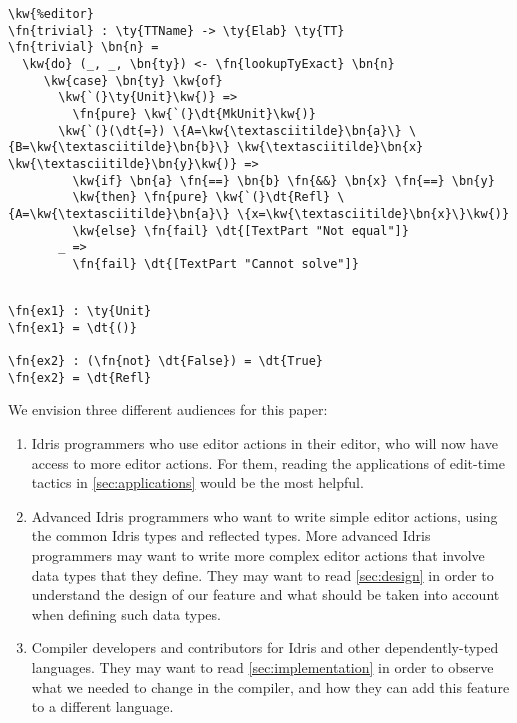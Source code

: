 \begin{Verbatim}
\kw{%editor}
\fn{trivial} : \ty{TTName} -> \ty{Elab} \ty{TT}
\fn{trivial} \bn{n} =
  \kw{do} (_, _, \bn{ty}) <- \fn{lookupTyExact} \bn{n}
     \kw{case} \bn{ty} \kw{of}
       \kw{`(}\ty{Unit}\kw{)} =>
         \fn{pure} \kw{`(}\dt{MkUnit}\kw{)}
       \kw{`(}(\dt{=}) \{A=\kw{\textasciitilde}\bn{a}\} \{B=\kw{\textasciitilde}\bn{b}\} \kw{\textasciitilde}\bn{x} \kw{\textasciitilde}\bn{y}\kw{)} =>
         \kw{if} \bn{a} \fn{==} \bn{b} \fn{&&} \bn{x} \fn{==} \bn{y}
         \kw{then} \fn{pure} \kw{`(}\dt{Refl} \{A=\kw{\textasciitilde}\bn{a}\} \{x=\kw{\textasciitilde}\bn{x}\}\kw{)}
         \kw{else} \fn{fail} \dt{[TextPart "Not equal"]}
       _ =>
         \fn{fail} \dt{[TextPart "Cannot solve"]}


\end{Verbatim}


\begin{Verbatim}
\fn{ex1} : \ty{Unit}
\fn{ex1} = \dt{()}

\fn{ex2} : (\fn{not} \dt{False}) = \dt{True}
\fn{ex2} = \dt{Refl}
\end{Verbatim}




We envision three different audiences for this paper:
\begin{enumerate}[(1)]
\item Idris programmers who use editor actions in their editor, who will now
  have access to more editor actions. For them, reading the applications of
edit-time tactics in \autoref{sec:applications} would be the most helpful.
\item Advanced Idris programmers who want to write simple editor actions, using
  the common Idris types and reflected types. More advanced Idris programmers
    may want to write more complex editor actions that involve data types
    that they define.
    They may want to read \autoref{sec:design} in order to understand the
    design of our feature and what should be taken into account when defining
    such data types.
\item Compiler developers and contributors for Idris and other
  dependently-typed languages.  They may want to read
    \autoref{sec:implementation} in order to observe what we needed to change
    in the compiler, and how they can add this feature to a different language.
\end{enumerate}
